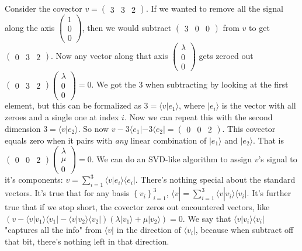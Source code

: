 \documentclass{amsbook}
\begin{document}
\begin{tcolorbox}[title=Example: Covector Analogy,colback=blue!5]
Consider the covector $v=\left(\begin{array}{ccc} 3 & 3 & 2 \end{array}\right)$.  If we wanted to remove all the signal along the axis $\left(\begin{array}{ccc} 1 \\ 0 \\ 0 \end{array}\right)$, then we would subtract $\left(\begin{array}{ccc} 3 & 0 & 0 \end{array}\right)$ from $v$ to get $\left(\begin{array}{ccc} 0 & 3 & 2 \end{array}\right)$.  Now any vector along that axis $\left(\begin{array}{c} \lambda \\ 0 \\ 0 \end{array}\right)$  gets zeroed out $\left(\begin{array}{ccc} 0 & 3 & 2 \end{array}\right)\left(\begin{array}{c} \lambda \\ 0 \\ 0 \end{array}\right) = 0$.  We got the $3$ when subtracting by looking at the first element, but this can be formalized as $3=\langle v|e_1\rangle$, where $|e_i\rangle$ is the vector with all zeroes and a single one at index $i$.  Now we can repeat this with the second dimension $3=\langle v|e_2\rangle$.  So now $v-3\langle e_1|-3\langle e_2| = \left(\begin{array}{ccc} 0 & 0 & 2 \end{array}\right)$.  This covector equals zero when it pairs with {\em any} linear combination of $|e_1\rangle$ and $|e_2\rangle$.  That is $\left(\begin{array}{ccc} 0 & 0 & 2 \end{array}\right)\left(\begin{array}{c} \lambda \\ \mu \\ 0 \end{array}\right) = 0$.  We can do an SVD-like algorithm to assign $v$'s signal to it's components: $v = \sum_{i=1}^3\langle v|e_i\rangle\langle e_i|$.  There's nothing special about the standard vectors.  It's true that for any basis $\left\{ v _i\right\}_{i=1}^3$, $\langle v| = \sum_{i=1}^3\langle v| v _i\rangle\langle v _i|$.  It's further true that if we stop short, the covector zeros out encountered vectors, like $\left(v-\langle v| v _1\rangle\langle v _1|-\langle v| v _2\rangle\langle v _2|\right)\left(\lambda| v _1\rangle+\mu| v _2\rangle\right)=0$.  We say that $\langle v| v _i\rangle\langle v _i|$ "captures all the info" from $\langle v|$ in the direction of $\langle v _i|$, because when subtract off that bit, there's nothing left in that direction.


\end{tcolorbox}
\end{document}
